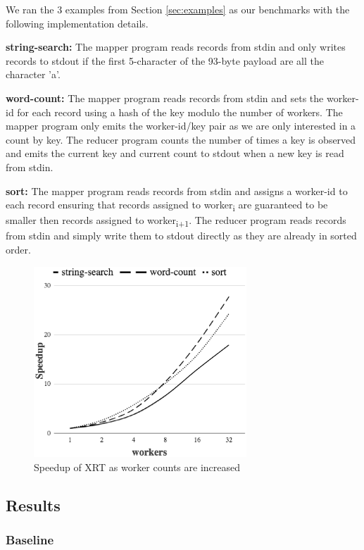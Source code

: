 \documentclass[twocolumn,11px]{article}       %
\begin{document}
We ran the 3 examples from Section \ref{sec:examples} as our benchmarks with the following implementation details.

\bigskip
\noindent
\textbf{string-search:} The mapper program reads records from stdin and only writes records to stdout if the first 5-character of the 93-byte payload are all the character 'a'.

\bigskip
\noindent
\textbf{word-count:} The mapper program reads records from stdin and sets the worker-id for each record using a hash of the key modulo the number of workers.
The mapper program only emits the worker-id/key pair as we are only interested in a count by key.
The reducer program counts the number of times a key is observed and emits the current key and current count to stdout when a new key is read from stdin.

\bigskip
\noindent
\textbf{sort:} The mapper program reads records from stdin and assigns a worker-id to each record ensuring that records assigned to worker\textsubscript{i} are guaranteed to be smaller then records assigned to worker\textsubscript{i+1}.
The reducer program reads records from stdin and simply write them to stdout directly as they are already in sorted order.

\begin{figure}[h]
  \centering
  \includegraphics[width=8cm]{graph.eps}
  \caption{Speedup of XRT as worker counts are increased}
  \label{fig:perf}
\end{figure}

\subsection{Results}

\subsubsection{Baseline}
\end{document}
